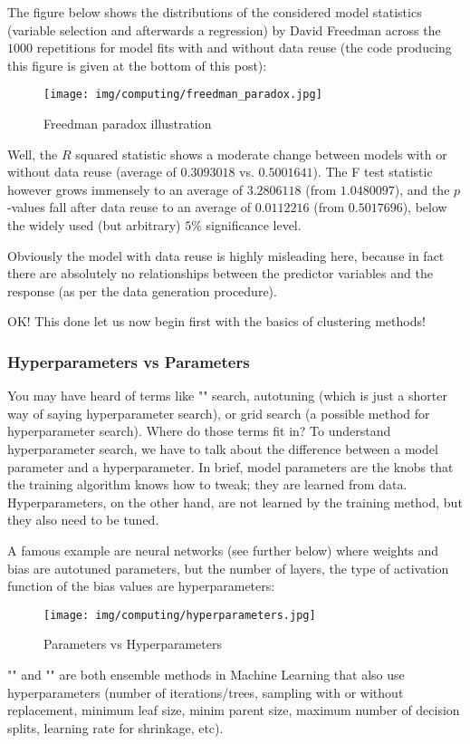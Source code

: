 	The figure below shows the distributions of the considered model statistics (variable selection and afterwards a regression) by David Freedman across the $1000$ repetitions for model fits with and without data reuse (the code producing this figure is given at the bottom of this post):
	\begin{figure}[H]
		\centering
		\texttt{[image: img/computing/freedman\_paradox.jpg]}
		\caption{Freedman paradox illustration}
	\end{figure}
	Well, the $R$ squared statistic shows a moderate change between models with or without data reuse (average of $0.3093018$ vs. $0.5001641$). The F test statistic however grows immensely to an average of $3.2806118$ (from $1.0480097$), and the $p$-values fall after data reuse to an average of $0.0112216$ (from $0.5017696$), below the widely used (but arbitrary) $5\%$ significance level.

	Obviously the model with data reuse is highly misleading here, because in fact there are absolutely no relationships between the predictor variables and the response (as per the data generation procedure).
	
	OK! This done let us now begin first with the basics of clustering methods! 
	
	\pagebreak
	\subsubsection{Hyperparameters vs Parameters}
	You may have heard of terms like "" search, autotuning (which is just a shorter way of saying hyperparameter search), or grid search (a possible method for hyperparameter search). Where do those terms fit in? To understand hyperparameter search, we have to talk about the difference between a model parameter and a hyperparameter. In brief, model parameters are the knobs that the training algorithm knows how to tweak; they are learned from data. Hyperparameters, on the other hand, are not learned by the training method, but they also need to be tuned.
	
	A famous example are neural networks (see further below) where weights and bias are autotuned parameters, but the number of layers, the type of activation function of the bias values are hyperparameters:
	\begin{figure}[H]
		\centering
		\texttt{[image: img/computing/hyperparameters.jpg]}
		\caption{Parameters vs Hyperparameters}
	\end{figure}
	"" and "" are both ensemble methods in Machine Learning that also use hyperparameters (number of iterations/trees, sampling with or without replacement, minimum leaf size, minim parent size, maximum number of decision splits, learning rate for shrinkage, etc).
	
